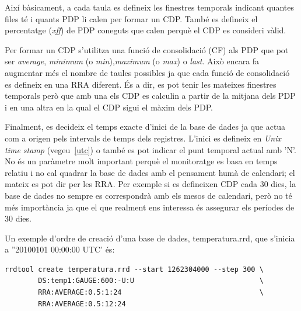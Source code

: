 Així bàsicament, a cada taula es defineix les finestres temporals indicant quantes files té i quants PDP li calen per formar un CDP. 
També es defineix el percentatge (\emph{xff}) de PDP coneguts que calen perquè el CDP es consideri vàlid. 
 
Per formar un CDP s'utilitza una funció de consolidació (CF) als PDP que pot ser \emph{average}, \emph{minimum} (o \emph{min}),\emph{maximum} (o \emph{max}) o \emph{last}. Això encara fa augmentar més el nombre de taules possibles ja que cada funció de consolidació es defineix en una RRA diferent. És a dir, es pot tenir les mateixes finestres temporals però que amb una els CDP es calculin a partir de la mitjana dels PDP i en una altra en la qual el CDP sigui el màxim dels PDP.





Finalment, es decideix el temps exacte d'inici de la base de dades ja que actua com a origen pels intervals de temps dels registres. L'inici es defineix en \emph{Unix time stamp} (vegeu~\ref{utc}) o també es pot indicar el punt temporal actual amb 'N'. No és un paràmetre molt important perquè el monitoratge es basa en temps relatiu i no cal quadrar la base de dades amb el pensament humà de calendari; el mateix es pot dir per les RRA. Per exemple si es defineixen CDP cada 30 dies, la base de dades no sempre es correspondrà amb els mesos de calendari, però no té més importància ja que el que realment ens interessa és assegurar els períodes de 30 dies.


Un exemple d'ordre de creació d'una base de dades, temperatura.rrd, que s'inicia a ''20100101 00:00:00 UTC' és:



\begin{verbatim}
rrdtool create temperatura.rrd --start 1262304000 --step 300 \
        DS:temp1:GAUGE:600:-U:U                              \ 
        RRA:AVERAGE:0.5:1:24                                 \
        RRA:AVERAGE:0.5:12:24                                       
\end{verbatim}

